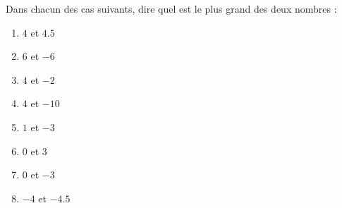 
\begin{exercice}\label{exo2smath-0048}

Dans chacun des cas suivants, dire quel est le plus grand des deux nombres :
\begin{multicols}{2}
    \begin{enumerate}
        \item
            \( 4\) et \( 4.5\)
        \item
            \( 6\) et \( -6\)
        \item
            \( 4\) et \( -2\)
        \item
            \( 4\) et \( -10\)
        \item
            \( 1\) et \( -3\)
        \item
            \( 0\) et \( 3\)
        \item
            \( 0\) et \( -3\)
        \item
            \( -4\) et \( -4.5\)
    \end{enumerate}
\end{multicols}

\end{exercice}
